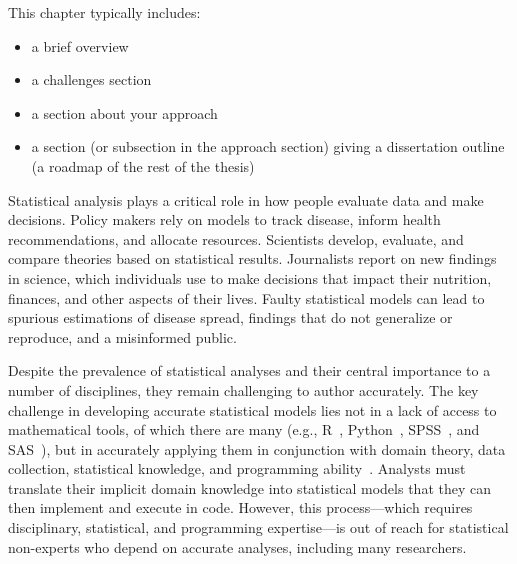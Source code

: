 This chapter typically includes: 
\begin{itemize}
    \item a brief overview
    \item a challenges section
    \item a section about your approach
    \item a section (or subsection in the approach section) giving a dissertation outline (a roadmap of the rest of the thesis)
\end{itemize}

Statistical analysis plays a critical role in how people evaluate data and make
decisions. Policy makers rely on models to track disease, inform health
recommendations, and allocate resources. Scientists develop, evaluate, and
compare theories based on statistical results. Journalists report on new
findings in science, which individuals use to make decisions that impact their
nutrition, finances, and other aspects of their lives. Faulty statistical models can lead to spurious estimations of disease spread,
findings that do not generalize or reproduce, and a misinformed public. 

Despite the prevalence of statistical analyses and their central importance to a
number of disciplines, they remain challenging to author accurately. The key
challenge in developing accurate statistical models lies not in a lack of access
to mathematical tools, of which there are many (e.g., R~\cite{team2013r},
Python~\cite{sanner1999python}, SPSS~\cite{spss}, and SAS~\cite{sas}), but in
accurately applying them in conjunction with domain theory, data collection,
statistical knowledge, and programming ability~\cite{mcelreath2020statistical}.
Analysts must translate their implicit domain knowledge into statistical models
that they can then implement and execute in code. However, this process---which
requires disciplinary, statistical, and programming expertise---is out of reach
for statistical non-experts who depend on accurate analyses, including many
researchers. 


